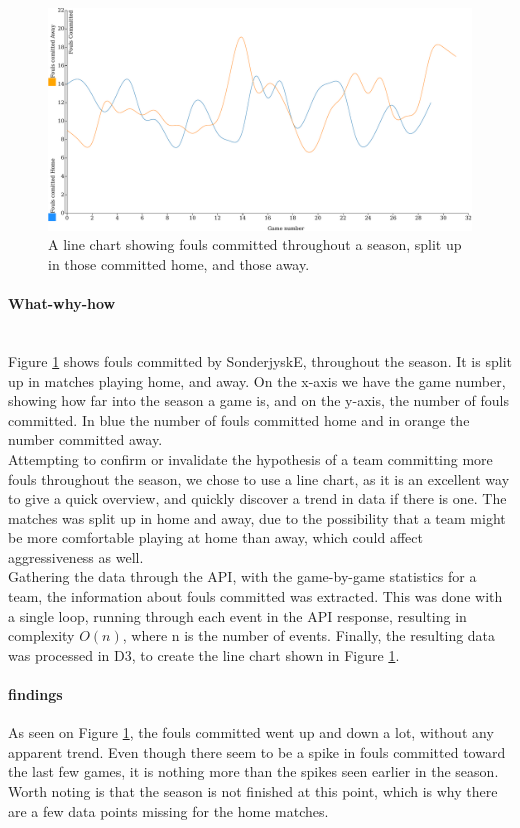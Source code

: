 \documentclass[Report.tex]{subfiles}
\begin{document}
\begin{figure}
\center
\includegraphics[width=\textwidth]{Figures/fouls.pdf}
\caption{A line chart showing fouls committed throughout a season, split up in those committed home, and those away.}
\label{Fig:FOULS}
\end{figure}


\paragraph{What-why-how\\\\}
Figure \ref{Fig:FOULS} shows fouls committed by SonderjyskE, throughout the season. It is split up in matches playing home, and away. On the x-axis we have the game number, showing how far into the season a game is, and on the y-axis, the number of fouls committed. In blue the number of fouls committed home and in orange the number committed away.\\

Attempting to confirm or invalidate the hypothesis of a team committing more fouls throughout the season, we chose to use a line chart, as it is an excellent way to give a quick overview, and quickly discover a trend in data if there is one. The matches was split up in home and away, due to the possibility that a team might be more comfortable playing at home than away, which could affect aggressiveness as well.\\

Gathering the data through the API, with the game-by-game statistics for a team, the information about fouls committed was extracted. This was done with a single loop, running through each event in the API response, resulting in complexity $O(n)$, where n is the number of events. Finally, the resulting data was processed in D3, to create the line chart shown in Figure \ref{Fig:FOULS}.

\paragraph{findings\\}
As seen on Figure \ref{Fig:FOULS}, the fouls committed went up and down a lot, without any apparent trend. Even though there seem to be a spike in fouls committed toward the last few games, it is nothing more than the spikes seen earlier in the season. Worth noting is that the season is not finished at this point, which is why there are a few data points missing for the home matches.
\end{document}
